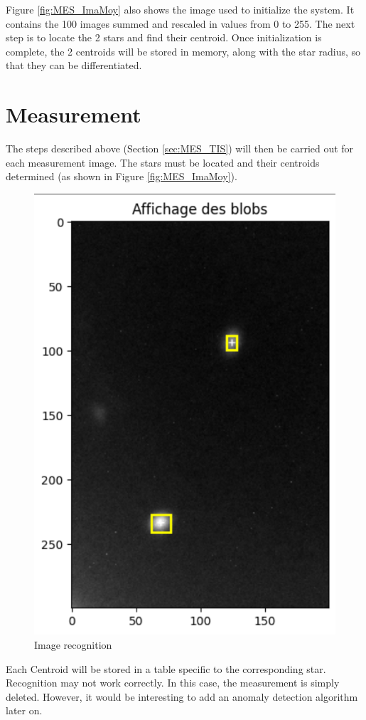 Figure \ref{fig:MES_ImaMoy} also shows the image used to initialize the system. It contains the 100 images summed and rescaled in values from 0 to 255.
The next step is to locate the 2 stars and find their centroid.
Once initialization is complete, the 2 centroids will be stored in memory, along with the star radius, so that they can
be differentiated.
\newpage
\section{Measurement}
The steps described above (Section \ref{sec:MES_TIS}) will then be carried out for each measurement image.
The stars must be located and their centroids determined (as shown in Figure \ref{fig:MES_ImaMoy}).
\begin{figure}[H]
    \centering
    \includegraphics[scale=0.75]{assets/figures/MesuresResultats/BlobsInit.png}
    \caption{Image recognition}
    \label{fig:MES_ImaBlob}
\end{figure}
Each Centroid will be stored in a table specific to the corresponding star.
\newline
Recognition may not work correctly. In this case, the measurement is simply deleted.
However, it would be interesting to add an anomaly detection algorithm later on.
\newpage
